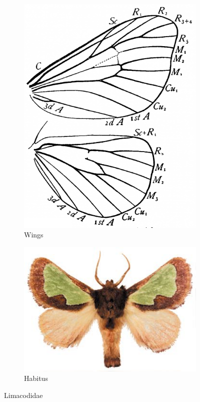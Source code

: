 \documentclass[letterpaper, 11pt]{article}
\begin{document}
\begin{figure}[ht!]
    \centering
    \begin{subfigure}[ht!]{0.35\textwidth}
        \includegraphics[width=\textwidth]{LimacodidWings}
        \caption{Wings \citep[Fig. 349]{comstock1918wings}}
        \label{fig:limacodid1}
    \end{subfigure}
    \qquad %
    \begin{subfigure}[ht!]{0.48\textwidth}
        \includegraphics[width=\textwidth]{image47}
        \caption{Habitus}
        \label{fig:limacodid2}
    \end{subfigure}
    \caption{Limacodidae}\label{fig:limacodids}
\end{figure}
\end{document}
